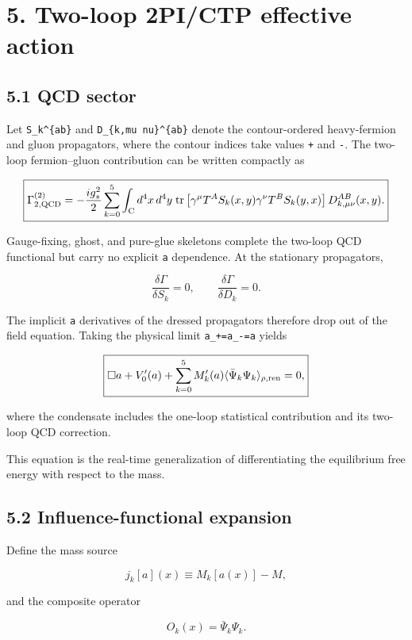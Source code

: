 \documentclass[
  10pt,
  a4paper,
]{article}
\begin{document}
\section{5. Two-loop 2PI/CTP effective
action}\label{two-loop-2pictp-effective-action}

\subsection{5.1 QCD sector}\label{qcd-sector}

Let \texttt{S\_k\^{}\{ab\}} and \texttt{D\_\{k,mu\ nu\}\^{}\{ab\}}
denote the contour-ordered heavy-fermion and gluon propagators, where
the contour indices take values \texttt{+} and \texttt{-}. The two-loop
fermion--gluon contribution can be written compactly as

\[
\boxed{
\Gamma_{2,{\rm QCD}}^{(2)}
=
-\frac{i g_s^2}{2}
\sum_{k=0}^{5}
\int_{\rm C}d^4x\,d^4y\;
{\rm tr}\left[
\gamma^\mu T^A S_k(x,y)
\gamma^\nu T^B S_k(y,x)
\right]
D^{AB}_{k,\mu\nu}(x,y).
}
\]

Gauge-fixing, ghost, and pure-glue skeletons complete the two-loop QCD
functional but carry no explicit \texttt{a} dependence. At the
stationary propagators,

\[
\frac{\delta\Gamma}{\delta S_k}=0,
\qquad
\frac{\delta\Gamma}{\delta D_k}=0.
\]

The implicit \texttt{a} derivatives of the dressed propagators therefore
drop out of the field equation. Taking the physical limit
\texttt{a\_+=a\_-=a} yields

\[
\boxed{
\Box a+V_0'(a)
+
\sum_{k=0}^{5}
M_k'(a)
\langle\bar\Psi_k\Psi_k\rangle_{\rho,{\rm ren}}
=0,
}
\]

where the condensate includes the one-loop statistical contribution and
its two-loop QCD correction.

This equation is the real-time generalization of differentiating the
equilibrium free energy with respect to the mass.

\subsection{5.2 Influence-functional
expansion}\label{influence-functional-expansion}

Define the mass source

\[
j_k[a](x)
\equiv
M_k[a(x)]-M,
\]

and the composite operator

\[
O_k(x)=\bar\Psi_k\Psi_k.
\]
\end{document}
